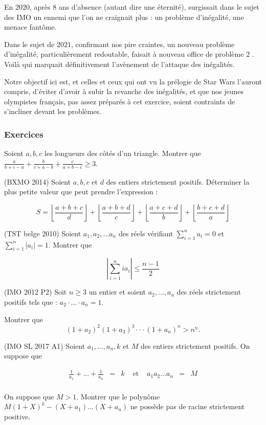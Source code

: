 
En $2020$, après $8$ ans d'absence (autant dire une éternité), surgissait dans le sujet des IMO un ennemi que l'on ne craignait plus : un problème d'inégalité, une menace fantôme.

Dans le sujet de $2021$, confirmant nos pire craintes, un nouveau problème d'inégalité, particulièrement redoutable, faisait à nouveau office de problème $2$ . Voilà qui marquait définitivement l'avènement de l'attaque des inégalités.

Notre objectif ici est, et celles et ceux qui ont vu la prélogie de Star Wars l'auront compris, d'éviter d'avoir à subir la revanche des inégalités, et que nos jeunes olympistes français, pas assez préparés à cet exercice, soient contraints de s'incliner devant les problèmes.

\subsubsection{Exercices}
\begin{exo}
Soient $a,b,c$ les longueurs des côtés d'un triangle. Montrer que $\frac{a}{b+c-a}+\frac{b}{c+a-b}+\frac{c}{a+b-c} \geq 3$.
\end{exo}

\begin{exo}
(BXMO 2014) Soient $a,b,c$ et $d$ des entiers strictement positifs. Déterminer la plus petite valeur que peut prendre l'expression :

\[S=\left\lfloor \frac{a+b+c}{d}\right\rfloor + \left\lfloor \frac{a+b+d}{c}\right\rfloor + \left\lfloor \frac{a+c+d}{b}\right\rfloor +\left\lfloor \frac{b+c+d}{a}\right\rfloor\]
\end{exo}

\begin{exo}
(TST belge 2010)
Soient $a_1,a_2,\ldots a_n$ des réels vérifiant $\sum_{i=1}^{n} a_i=0$ et $\sum_{i=1}^{n} |a_i| =1$. Montrer que

\[\left| \sum_{i=1}^{n} ia_i \right| \leqslant \frac{n-1}2\]
\end{exo}


\begin{exo}
(IMO 2012 P2)
Soit $n \geq 3$ un entier et soient $a_2,\dots,a_n$ des réels strictement positifs tels que : $a_2 \cdot \dots \cdot a_n =1$.

Montrer que
\[
(1+a_2)^2(1+a_3)^3 \cdot \cdot \cdot (1+a_n)^n > n^n.
\]
\end{exo}

\begin{exo}
(IMO SL 2017 A1)
Soient $a_1, \ldots, a_n, k$ et $M$ des entiers strictement positifs. On suppose que

\[\begin{array}{lllllll}
\frac1{a_1}+ \ldots + \frac1{a_n} &=& k &\text{ et }& a_1 a_2 \ldots a_n &=& M\\
\end{array}\]

On suppose que $M>1$. Montrer que le polynôme $M(1+X)^k-(X+a_1) \ldots (X+a_n)$ ne possède pas de racine strictement positive.
\end{exo}

